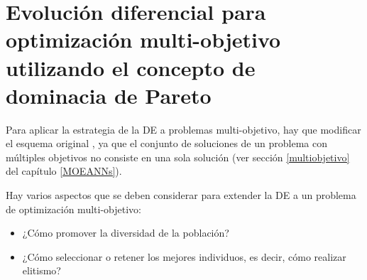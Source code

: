 \section{Evolución diferencial para optimización multi-objetivo utilizando el concepto de
dominacia de Pareto}
\noindent Para aplicar la estrategia de la DE a problemas multi-objetivo, hay que
modificar el esquema original \cite{Storn1997}, ya que el conjunto de soluciones de un
problema con múltiples objetivos no consiste en una sola solución (ver sección
\ref{multiobjetivo} del capítulo \ref{MOEANNs}).

Hay varios aspectos que se deben considerar para extender la DE a un problema de
optimización multi-objetivo:
\begin{itemize}
	\item ¿Cómo promover la diversidad de la población?
	\item ¿Cómo seleccionar o retener los mejores individuos, es decir, cómo realizar
	elitismo?
\end{itemize}

